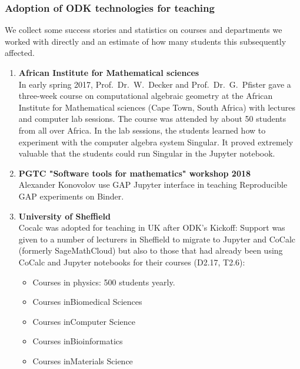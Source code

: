\subsubsection{Adoption of ODK technologies for teaching}

We collect some success stories and statistics on courses and
departments we worked with directly and an estimate of how many
students this subsequently affected.


\begin{enumerate}
\item \textbf{African Institute for Mathematical sciences}\\
  In early spring 2017, Prof.~Dr.~W.~Decker and Prof.~Dr.~G.~Pfister
  gave a three-week course on computational algebraic geometry at the
  African Institute for Mathematical sciences (Cape Town, South
  Africa) with lectures and computer lab sessions. The course was
  attended by about 50 students from all over Africa. In the lab
  sessions, the students learned how to experiment with the computer
  algebra system Singular. It proved extremely valuable that the
  students could run Singular in the Jupyter notebook.

\item \textbf{PGTC "Software tools for mathematics" workshop 2018}\\
  Alexander Konovolov use GAP Jupyter interface in teaching
  Reproducible GAP experiments on Binder.

\item \textbf{University of Sheffield}\\
  Cocalc was adopted for teaching in UK after ODK's Kickoff: Support
  was given to a number of lecturers in Sheffield to migrate to
  Jupyter and CoCalc (formerly SageMathCloud) but also to those that
  had already been using CoCalc and Jupyter notebooks for their
  courses (D2.17, T2.6):
  \begin{itemize}
  \item Courses in physics: 500 students yearly.
  \item Courses inBiomedical Sciences
  \item Courses inComputer Science
  \item Courses inBioinformatics
  \item Courses inMaterials Science
  \end{itemize}


\end{enumerate}
